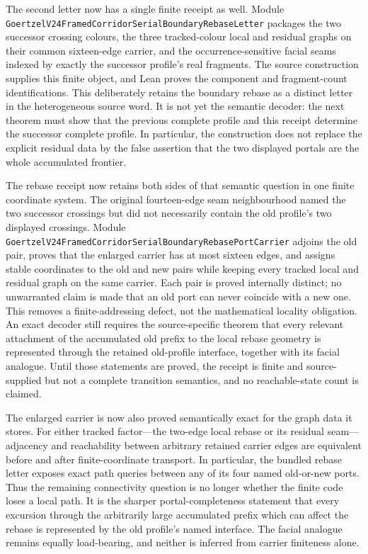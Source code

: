 \documentclass[11pt]{article}
\theoremstyle{definition}
\begin{document}
The second letter now has a single finite receipt as well.  Module
\texttt{GoertzelV24FramedCorridorSerialBoundaryRebaseLetter} packages the two
successor crossing colours, the three tracked-colour local and residual graphs
on their common sixteen-edge carrier, and the occurrence-sensitive facial
seams indexed by exactly the successor profile's real fragments.  The source
construction supplies this finite object, and Lean proves the component and
fragment-count identifications.  This deliberately retains the boundary
rebase as a distinct letter in the heterogeneous source word.  It is not yet
the semantic decoder: the next theorem must show that the previous complete
profile and this receipt determine the successor complete profile.  In
particular, the construction does not replace the explicit residual data by
the false assertion that the two displayed portals are the whole accumulated
frontier.

The rebase receipt now retains both sides of that semantic question in one
finite coordinate system.  The original fourteen-edge seam neighbourhood
named the two successor crossings but did not necessarily contain the old
profile's two displayed crossings.  Module
\texttt{GoertzelV24FramedCorridorSerialBoundaryRebasePortCarrier} adjoins the
old pair, proves that the enlarged carrier has at most sixteen edges, and
assigns stable coordinates to the old and new pairs while keeping every
tracked local and residual graph on the same carrier.  Each pair is proved
internally distinct; no unwarranted claim is made that an old port can never
coincide with a new one.  This removes a finite-addressing defect, not the
mathematical locality obligation.  An exact decoder still requires the
source-specific theorem that every relevant attachment of the accumulated
old prefix to the local rebase geometry is represented through the retained
old-profile interface, together with its facial analogue.  Until those
statements are proved, the receipt is finite and source-supplied but not a
complete transition semantics, and no reachable-state count is claimed.

The enlarged carrier is now also proved semantically exact for the graph data
it stores.  For either tracked factor---the two-edge local rebase or its
residual seam---adjacency and reachability between arbitrary retained carrier
edges are equivalent before and after finite-coordinate transport.  In
particular, the bundled rebase letter exposes exact path queries between any
of its four named old-or-new ports.  Thus the remaining connectivity question
is no longer whether the finite code loses a local path.  It is the sharper
portal-completeness statement that every excursion through the arbitrarily
large accumulated prefix which can affect the rebase is represented by the
old profile's named interface.  The facial analogue remains equally
load-bearing, and neither is inferred from carrier finiteness alone.
\end{document}
